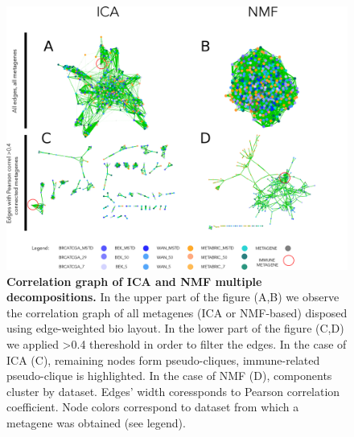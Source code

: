 \documentclass[12pt,]{book}
\theoremstyle{definition}
\theoremstyle{definition}
\theoremstyle{definition}
\theoremstyle{remark}
\begin{document}
\begin{figure}

{\centering \includegraphics[width=1\linewidth]{figures-ext/ICANMF} 

}

\caption{\textbf{Correlation graph of ICA and NMF multiple
decompositions.} In the upper part of the figure (A,B) we observe the
correlation graph of all metagenes (ICA or NMF-based) disposed using
edge-weighted bio layout. In the lower part of the figure (C,D) we
applied \textgreater{}0.4 thereshold in order to filter the edges. In
the case of ICA (C), remaining nodes form pseudo-cliques, immune-related
pseudo-clique is highlighted. In the case of NMF (D), components cluster
by dataset. Edges' width coressponds to Pearson correlation coefficient.
Node colors correspond to dataset from which a metagene was obtained
(see legend).}\label{fig:ICAvsNMF}
\end{figure}
\end{document}
